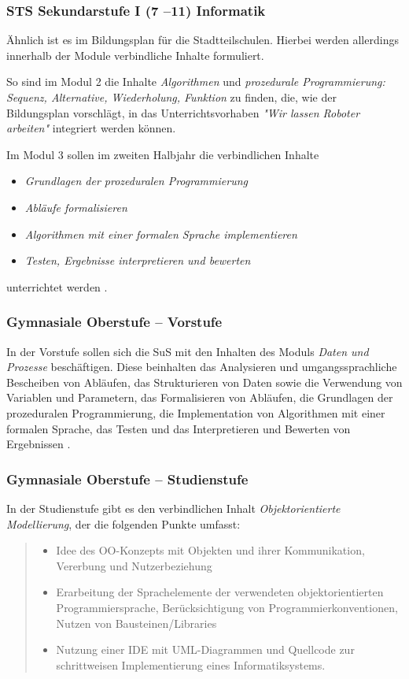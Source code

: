 \documentclass[paper=a4, pagesize, DIV=calc, BCOR=15.5mm, twoside=on, onecolumn=on, open = right, titlepage =on, parskip =half-, headsepline = on, footsepline = on, chapterprefix = on, appendixprefix = off, fontsize = 12pt, numbers = noenddot, abstract = on]{scrbook}
\numberwithin{equation}{chapter}
\theoremstyle{definition}
\theoremstyle{plain}
\theoremstyle{plain}
\theoremstyle{remark}
\theoremstyle{plain}
\theoremstyle{plain}
\begin{document}
\subsubsection{STS Sekundarstufe I (7 --11) Informatik}
Ähnlich ist es im Bildungsplan für die Stadtteilschulen. Hierbei werden allerdings innerhalb der Module verbindliche Inhalte formuliert.

So sind im Modul 2 die Inhalte \emph{Algorithmen} und \emph{prozedurale Programmierung: Sequenz, Alternative, Wiederholung, Funktion} zu finden, die, wie der Bildungsplan vorschlägt, in das Unterrichtsvorhaben \emph{"Wir lassen Roboter arbeiten"} integriert werden können.

Im Modul 3 sollen im zweiten Halbjahr die verbindlichen Inhalte
\begin{itemize}
\item \emph{Grundlagen der prozeduralen Programmierung}
\item \emph{Abläufe formalisieren}
\item \emph{Algorithmen mit einer formalen Sprache implementieren}
\item \emph{Testen, Ergebnisse interpretieren und bewerten}
\end{itemize}
unterrichtet werden \cite{stsmittel:14}. 


\subsubsection{Gymnasiale Oberstufe -- Vorstufe}

In der Vorstufe sollen sich die SuS mit den Inhalten des Moduls \emph{Daten und Prozesse} beschäftigen. Diese beinhalten das Analysieren und umgangssprachliche Bescheiben von Abläufen, das Strukturieren von Daten sowie die Verwendung von Variablen und Parametern, das Formalisieren von Abläufen, die Grundlagen der prozeduralen Programmierung, die Implementation von Algorithmen mit einer formalen Sprache, das Testen und das Interpretieren und Bewerten von Ergebnissen \cite{oberstufe:09}. 

\subsubsection{Gymnasiale Oberstufe -- Studienstufe}

In der Studienstufe gibt es den verbindlichen Inhalt \emph{Objektorientierte Modellierung}, der die folgenden Punkte umfasst:\\
\begin{quote}
\begin{itemize}
\item Idee des OO-Konzepts mit Objekten und ihrer Kommunikation, Vererbung und Nutzerbeziehung
\item Erarbeitung der Sprachelemente der verwendeten objektorientierten Programmiersprache, Berücksichtigung von Programmierkonventionen, Nutzen von Bausteinen/Libraries
\item Nutzung einer IDE mit UML-Diagrammen und Quellcode zur schrittweisen Implementierung eines Informatiksystems. \qquad \cite{oberstufe:09}
\end{itemize}
\end{quote}
\end{document}
